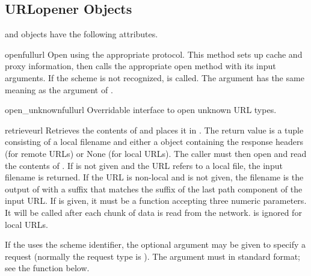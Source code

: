 \subsection{URLopener Objects \label{urlopener-objs}}

 and  objects have the
following attributes.

\begin{methoddesc}[URLopener]{open}{fullurl}
Open  using the appropriate protocol.  This method sets 
up cache and proxy information, then calls the appropriate open method with
its input arguments.  If the scheme is not recognized,
 is called.  The  argument 
has the same meaning as the  argument of .
\end{methoddesc}

\begin{methoddesc}[URLopener]{open_unknown}{fullurl}
Overridable interface to open unknown URL types.
\end{methoddesc}

\begin{methoddesc}[URLopener]{retrieve}{url}
Retrieves the contents of  and places it in .  The
return value is a tuple consisting of a local filename and either a
 object containing the response headers (for remote
URLs) or None (for local URLs).  The caller must then open and read the
contents of .  If  is not given and the URL
refers to a local file, the input filename is returned.  If the URL is
non-local and  is not given, the filename is the output of
 with a suffix that matches the suffix of the last
path component of the input URL.  If  is given, it must be
a function accepting three numeric parameters.  It will be called after each
chunk of data is read from the network.   is ignored for
local URLs.

If the  uses the  scheme identifier, the optional
 argument may be given to specify a  request
(normally the request type is ).  The  argument
must in standard  format;
see the  function below.
\end{methoddesc}

